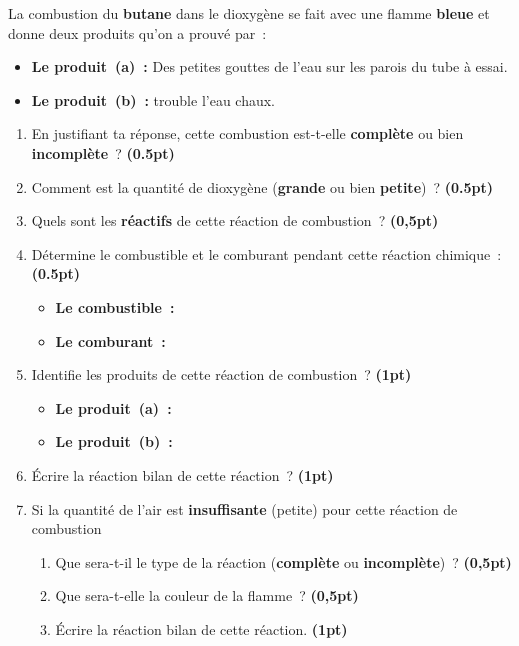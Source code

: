 La combustion du \textbf{butane} dans le dioxygène se fait avec une flamme
\textbf{bleue} et donne deux produits qu'on a prouvé par~:
\begin{itemize}
    \item \textbf{Le produit~(a)~:} Des petites gouttes de l'eau sur les parois
          du tube à essai.
    \item \textbf{Le produit~(b)~:} trouble l'eau chaux.
\end{itemize}
\begin{enumerate}
    \item En justifiant ta réponse, cette combustion est-t-elle
          \textbf{complète} ou bien \textbf{incomplète}~?
          \textbf{(0.5pt)}
          \answerlines[1]{1mm}
    \item Comment est la quantité de dioxygène (\textbf{grande} ou
          bien \textbf{petite})~?
          \textbf{(0.5pt)}
          \answerlines[1]{1mm}
    \item Quels sont les \textbf{réactifs} de cette réaction de combustion~?
          \textbf{(0,5pt)}
          \answerlines[1]{1mm}
    \item Détermine le combustible et le comburant pendant cette réaction
          chimique~:
          \textbf{(0.5pt)} \par
          \begin{itemize}
              \item \textbf{Le combustible~:} \dotfill
              \item \textbf{Le comburant~:} \dotfill
          \end{itemize}
    \item Identifie les produits de cette réaction de combustion~?
          \textbf{(1pt)} \par
          \begin{itemize}
              \item \textbf{Le produit~(a)~:} \dotfill
              \item \textbf{Le produit~(b)~:} \dotfill
          \end{itemize}
    \item Écrire la réaction bilan de cette réaction~?
          \textbf{(1pt)}
          \answerlines[1]{1mm}
    \item Si la quantité de l'air est \textbf{insuffisante} (petite) pour cette
          réaction de combustion
          \begin{enumerate}
              \item Que sera-t-il le type de la réaction (\textbf{complète} ou
                    \textbf{incomplète})~?
                    \textbf{(0,5pt)}
                    \answerlines[1]{1mm}
              \item Que sera-t-elle la couleur de la flamme~?
                    \textbf{(0,5pt)}
                    \answerlines[1]{1mm}
              \item Écrire la réaction bilan de cette réaction.
                    \textbf{(1pt)}
                    \answerlines[1]{1mm}
          \end{enumerate}
\end{enumerate}
